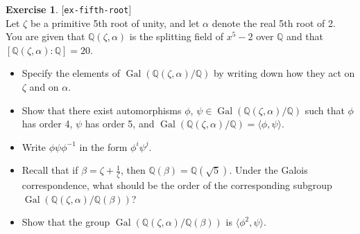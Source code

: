 \documentclass{amsart}
\newcommand{\Gal}       {\operatorname{Gal}}
\newcommand{\Q}         {{\mathbb{Q}}}
\newcommand{\al}        {\alpha}
\newcommand{\bt}        {\beta}
\newcommand{\zt}        {\zeta}
\renewcommand{\:}{\colon}
\newcommand{\lastexlabel}{}
\newcommand{\exlabel}[1]{
 \global\def\lastexlabel{#1}\label{#1}[\texttt{#1}]\ \\
}
\newcommand{\exlabel}[1]{
 \global\def\lastexlabel{#1}\label{#1}
}
\theoremstyle{definition}
\newtheorem{exercise}{Exercise}[section]
\begin{document}
\begin{exercise}\exlabel{ex-fifth-root}
 Let $\zt$ be a primitive 5th root of unity, and let $\al$ denote the 
 real 5th root of 2. You are given that $\Q(\zt,\al)$ is the
 splitting field of $x^5-2$ over $\Q$ and that $[\Q(\zt,\al):\Q]=20$.
 \begin{itemize}
  \item Specify the elements of $\Gal(\Q(\zt,\al)/\Q)$ by
   writing down how they act on $\zt$ and on $\al$.
  \item Show that there exist automorphisms $\phi$, 
   $\psi\in\Gal(\Q(\zt,\al)/\Q)$ such that $\phi$ has order 4,
   $\psi$ has order 5, and 
   $\Gal(\Q(\zt,\al)/\Q)=\langle\phi,\psi\rangle$.
  \item Write $\phi\psi\phi^{-1}$ in the form $\phi^i\psi^j$.
  \item 
   Recall that if $\bt=\zt+\frac{1}{\zt}$, then
   $\Q(\bt)=\Q(\sqrt{5})$. Under the Galois correspondence, what should
   be the order of the corresponding subgroup 
   $\Gal(\Q(\zt,\al)/\Q(\bt))$?
  \item Show that the group $\Gal(\Q(\zt,\al)/\Q(\bt))$
   is $\langle\phi^2,\psi\rangle$.
 \end{itemize}
\end{exercise}
\end{document}
